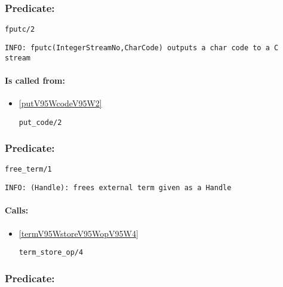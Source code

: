 \subsubsection{Predicate:} \label{fputcV95W2}

\begin{verbatim}
fputc/2
\end{verbatim}

{\small \begin{verbatim}
INFO: fputc(IntegerStreamNo,CharCode) outputs a char code to a C stream

\end{verbatim}}
\paragraph{Is called from:} 
\begin{itemize}
\item \ref{putV95WcodeV95W2} 
\begin{verbatim}
put_code/2
\end{verbatim}

\end{itemize}

\subsubsection{Predicate:} \label{freeV95WtermV95W1}

\begin{verbatim}
free_term/1
\end{verbatim}

{\small \begin{verbatim}
INFO: (Handle): frees external term given as a Handle

\end{verbatim}}
\paragraph{Calls:} 
\begin{itemize}
\item \ref{termV95WstoreV95WopV95W4} 
\begin{verbatim}
term_store_op/4
\end{verbatim}

\end{itemize}

\subsubsection{Predicate:} \label{freeV95WthreadV95WguardV95W1}

